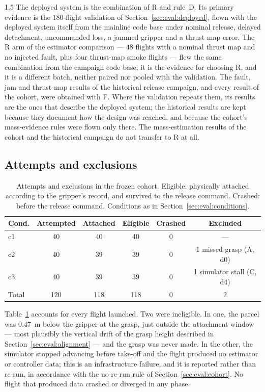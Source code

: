 \begin{spacing}{1.5}
The deployed system is the combination of R and rule~D. Its primary evidence
is the $180$-flight validation of Section~\ref{sec:eval:deployed}, flown with
the deployed system itself from the mainline code base under nominal release,
delayed detachment, uncommanded loss, a jammed gripper and a thrust-map error.
The R arm of the estimator comparison --- $48$ flights with a nominal thrust map
and no injected fault, plus four thrust-map smoke flights --- flew the same
combination from the campaign code base; it is the evidence for choosing R, and
it is a different batch, neither paired nor pooled with the validation. The
fault, jam and thrust-map results of the historical release campaign, and every
result of the cohort, were obtained with F. Where the validation repeats them,
its results are the ones that describe the deployed system; the historical
results are kept because they document how the design was reached, and because
the cohort's mass-evidence rules were flown only there. The mass-estimation
results of the cohort and the historical campaign do not transfer to R at all.

\subsection{Attempts and exclusions}\label{sec:eval:attempts}

\begin{table}[ht]
\centering
\caption[Attempts and exclusions in the frozen cohort]{Attempts and exclusions in the frozen cohort. Eligible: physically
attached according to the gripper's record, and survived to the release
command. Crashed: before the release command. Conditions as in
Section~\ref{sec:eval:conditions}.}
\label{tab:attempts}
\small
\begin{tabular}{@{}l c c c c c@{}}
\toprule
\textbf{Cond.} & \textbf{Attempted} & \textbf{Attached} & \textbf{Eligible} &
\textbf{Crashed} & \textbf{Excluded} \\
\midrule
c1 & 40 & 40 & 40 & 0 & --- \\
c2 & 40 & 39 & 39 & 0 & 1 missed grasp (A, d0) \\
c3 & 40 & 39 & 39 & 0 & 1 simulator stall (C, d4) \\
\midrule
Total & 120 & 118 & 118 & 0 & 2 \\
\bottomrule
\end{tabular}
\end{table}

Table~\ref{tab:attempts} accounts for every flight launched. Two were
ineligible. In one, the parcel was \SI{0.47}{\meter} below the gripper at the
grasp, just outside the attachment window --- most plausibly the vertical drift
of the grasp height described in Section~\ref{sec:eval:alignment} --- and the
grasp was never made. In
the other, the simulator stopped advancing before take-off and the flight
produced no estimator or controller data; this is an infrastructure failure, and
it is reported rather than re-run, in accordance with the no-re-run rule of
Section~\ref{sec:eval:cohort}. No flight that produced data crashed or diverged
in any phase.


\end{spacing}
